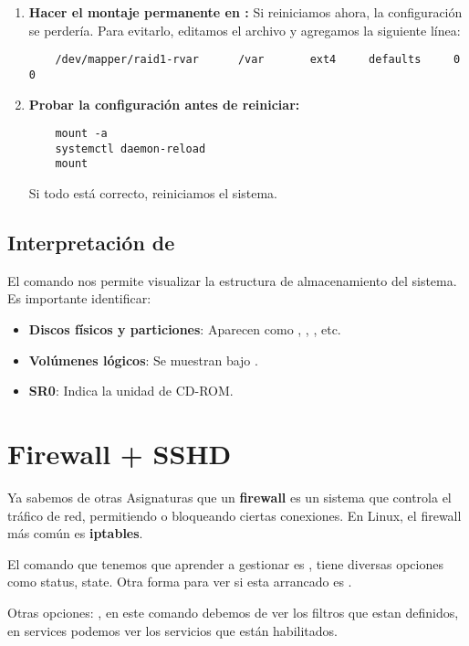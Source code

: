 \begin{enumerate}
    \item \textbf{Hacer el montaje permanente en :}  
    Si reiniciamos ahora, la configuración se perdería. Para evitarlo, editamos el archivo  y agregamos la siguiente línea:
    \begin{verbatim}
    /dev/mapper/raid1-rvar      /var       ext4     defaults     0 0
    \end{verbatim}
    
    \item \textbf{Probar la configuración antes de reiniciar:}  
    \begin{verbatim}
    mount -a
    systemctl daemon-reload
    mount
    \end{verbatim}
    Si todo está correcto, reiniciamos el sistema.
\end{enumerate}

\subsection{Interpretación de }

El comando  nos permite visualizar la estructura de almacenamiento del sistema. Es importante identificar:

\begin{itemize}
    \item \textbf{Discos físicos y particiones}: Aparecen como , , , etc.
    \item \textbf{Volúmenes lógicos}: Se muestran bajo .
    \item \textbf{SR0}: Indica la unidad de CD-ROM.
\end{itemize}

\newpage
\section{Firewall + SSHD}

Ya sabemos de otras Asignaturas que un \textbf{firewall} es un sistema que controla el tráfico de red, permitiendo o bloqueando ciertas conexiones. En Linux, el firewall más común es \textbf{iptables}.

El comando que tenemos que aprender a gestionar es , tiene diversas opciones como status, state. Otra forma para ver si esta arrancado es .

Otras opciones: , en este comando debemos de ver los filtros que estan definidos, en services podemos ver los servicios que están habilitados.

